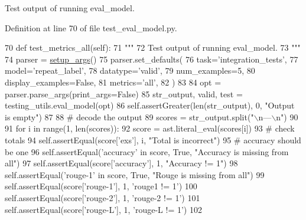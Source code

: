 \begin{DoxyVerb}Test output of running eval_model.
\end{DoxyVerb}
 

Definition at line 70 of file test\+\_\+eval\+\_\+model.\+py.


\begin{DoxyCode}
70     \textcolor{keyword}{def }test\_metrics\_all(self):
71         \textcolor{stringliteral}{"""}
72 \textcolor{stringliteral}{        Test output of running eval\_model.}
73 \textcolor{stringliteral}{        """}
74         parser = \hyperlink{namespaceparlai_1_1chat__service_1_1services_1_1browser__chat_1_1client_a20c9862417d1f1a61b06551de0820ee4}{setup\_args}()
75         parser.set\_defaults(
76             task=\textcolor{stringliteral}{'integration\_tests'},
77             model=\textcolor{stringliteral}{'repeat\_label'},
78             datatype=\textcolor{stringliteral}{'valid'},
79             num\_examples=5,
80             display\_examples=\textcolor{keyword}{False},
81             metrics=\textcolor{stringliteral}{'all'},
82         )
83 
84         opt = parser.parse\_args(print\_args=\textcolor{keyword}{False})
85         str\_output, valid, test = testing\_utils.eval\_model(opt)
86         self.assertGreater(len(str\_output), 0, \textcolor{stringliteral}{"Output is empty"})
87 
88         \textcolor{comment}{# decode the output}
89         scores = str\_output.split(\textcolor{stringliteral}{"\(\backslash\)n---\(\backslash\)n"})
90 
91         \textcolor{keywordflow}{for} i \textcolor{keywordflow}{in} range(1, len(scores)):
92             score = ast.literal\_eval(scores[i])
93             \textcolor{comment}{# check totals}
94             self.assertEqual(score[\textcolor{stringliteral}{'exs'}], i, \textcolor{stringliteral}{"Total is incorrect"})
95             \textcolor{comment}{# accuracy should be one}
96             self.assertEqual(\textcolor{stringliteral}{'accuracy'} \textcolor{keywordflow}{in} score, \textcolor{keyword}{True}, \textcolor{stringliteral}{"Accuracy is missing from all"})
97             self.assertEqual(score[\textcolor{stringliteral}{'accuracy'}], 1, \textcolor{stringliteral}{"Accuracy != 1"})
98             self.assertEqual(\textcolor{stringliteral}{'rouge-1'} \textcolor{keywordflow}{in} score, \textcolor{keyword}{True}, \textcolor{stringliteral}{"Rouge is missing from all"})
99             self.assertEqual(score[\textcolor{stringliteral}{'rouge-1'}], 1, \textcolor{stringliteral}{'rouge1 != 1'})
100             self.assertEqual(score[\textcolor{stringliteral}{'rouge-2'}], 1, \textcolor{stringliteral}{'rouge-2 != 1'})
101             self.assertEqual(score[\textcolor{stringliteral}{'rouge-L'}], 1, \textcolor{stringliteral}{'rouge-L != 1'})
102 
\end{DoxyCode}
